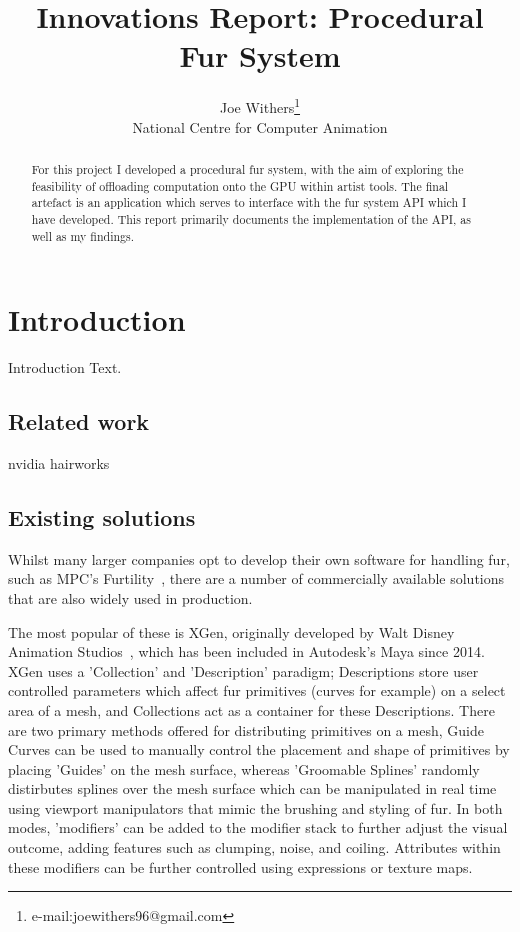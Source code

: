 \documentclass[]{acmsiggraph}
\title{Innovations Report: Procedural Fur System}
\author{Joe Withers\thanks{e-mail:joewithers96@gmail.com}\\National Centre for Computer Animation}
\begin{document}
\maketitle

\begin{abstract}
For this project I developed a procedural fur system, with the aim of exploring the feasibility of offloading computation onto the GPU within artist tools. The final artefact is an application which serves to interface with the fur system API which I have developed. This report primarily documents the implementation of the API, as well as my findings.
\end{abstract}

\section{Introduction} \label{sec:introduction}
Introduction Text.
\subsection{Related work} \label{sec:related}
nvidia hairworks

\subsection{Existing solutions} \label{sec:existing}
Whilst many larger companies opt to develop their own software for handling fur, such as MPC's Furtility~\cite{furtility}, there are a number of commercially available solutions that are also widely used in production.

The most popular of these is XGen, originally developed by Walt Disney Animation Studios~\cite{xgen}, which has been included in Autodesk's Maya since 2014. XGen uses a 'Collection' and 'Description' paradigm; Descriptions store user controlled parameters which affect fur primitives (curves for example) on a select area of a mesh, and Collections act as a container for these Descriptions. There are two primary methods offered for distributing primitives on a mesh, Guide Curves can be used to manually control the placement and shape of primitives by placing 'Guides' on the mesh surface, whereas 'Groomable Splines' randomly distirbutes splines over the mesh surface which can be manipulated in real time using viewport manipulators that mimic the brushing and styling of fur. In both modes, 'modifiers' can be added to the modifier stack to further adjust the visual outcome, adding features such as clumping, noise, and coiling. Attributes within these modifiers can be further controlled using expressions or texture maps.
\end{document}
